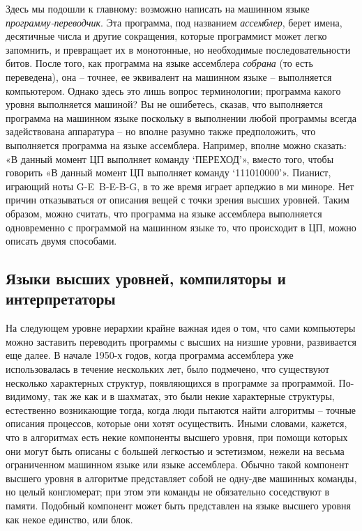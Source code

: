 \documentclass[../main.tex]{subfiles}
\begin{document}
Здесь мы подошли к главному: возможно написать на машинном языке \emph{программу-переводчик}. Эта программа, под названием \emph{ассемблер}, берет имена, десятичные числа и другие сокращения, которые программист может легко запомнить, и превращает их в монотонные, но необходимые последовательности битов. После того, как программа на языке ассемблера \emph{собрана} (то есть переведена), она \--- точнее, ее эквивалент на машинном языке \--- выполняется компьютером. Однако здесь это лишь вопрос терминологии; программа какого уровня выполняется машиной? Вы не ошибетесь, сказав, что выполняется программа на машинном языке поскольку в выполнении любой программы всегда задействована аппаратура \--- но вполне разумно также предположить, что выполняется программа на языке ассемблера. Например, вполне можно сказать: «В данный момент ЦП выполняет команду \enquote*{ПЕРЕХОД}», вместо того, чтобы говорить «В данный момент ЦП выполняет команду \enquote*{111010000}». Пианист, играющий ноты \mbox{G-E B-E-B-G}, в то же время играет арпеджио в ми миноре. Нет причин отказываться от описания вещей с точки зрения высших уровней. Таким образом, можно считать, что программа на языке ассемблера выполняется одновременно с программой на машинном языке то, что происходит в ЦП, можно описать двумя способами.


\subsection{Языки высших уровней, компиляторы и интерпретаторы}

На следующем уровне иерархии крайне важная идея о том, что сами компьютеры можно заставить переводить программы с высших на низшие уровни, развивается еще далее. В начале 1950-х годов, когда программа ассемблера уже использовалась в течение нескольких лет, было подмечено, что существуют несколько характерных структур, появляющихся в программе за программой. По-видимому, так же как и в шахматах, это были некие характерные структуры, естественно возникающие тогда, когда люди пытаются найти алгоритмы \--- точные описания процессов, которые они хотят осуществить. Иными словами, кажется, что в алгоритмах есть некие компоненты высшего уровня, при помощи которых они могут быть описаны с большей легкостью и эстетизмом, нежели на весьма ограниченном машинном языке или языке ассемблера. Обычно такой компонент высшего уровня в алгоритме представляет собой не одну-две машинных команды, но целый конгломерат; при этом эти команды не обязательно соседствуют в памяти. Подобный компонент может быть представлен на языке высшего уровня как некое единство, или блок.
\end{document}
